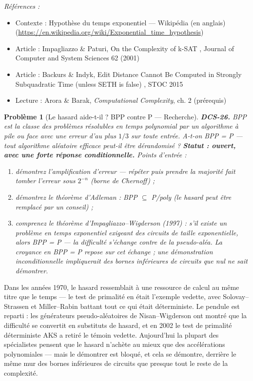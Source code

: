 \documentclass[11pt]{article}
\newtheorem{problem}{Problème}
\newenvironment{refs}{\par\small\noindent\emph{Références :}\begin{itemize}\setlength\itemsep{0pt}}{\end{itemize}\normalsize}
\begin{document}
\begin{refs}
\item Contexte : Hypothèse du temps exponentiel --- Wikipédia (en anglais) (\url{https://en.wikipedia.org/wiki/Exponential_time_hypothesis})
\item Article : Impagliazzo \& Paturi, \og{} On the Complexity of k-SAT \fg{}, Journal of Computer and System Sciences 62 (2001)
\item Article : Backurs \& Indyk, \og{} Edit Distance Cannot Be Computed in Strongly Subquadratic Time (unless SETH is false) \fg{}, STOC 2015
\item Lecture : Arora \& Barak, \textit{Computational Complexity}, ch. 2 (prérequis)
\end{refs}

\bigskip

\begin{problem}[{Le hasard aide-t-il ? BPP contre P --- Recherche}]
\textbf{DCS-26.} BPP est la classe des problèmes résolubles en temps polynomial par un algorithme à pile ou face avec une erreur d'au plus $1/3$ sur toute entrée. A-t-on BPP = P --- tout algorithme aléatoire efficace peut-il être dérandomisé ? \textbf{Statut : ouvert, avec une forte réponse conditionnelle.} Points d'entrée :
\begin{enumerate}
\item[(a)] démontrez l'amplification d'erreur --- répéter puis prendre la majorité fait tomber l'erreur sous $2^{-n}$ (borne de Chernoff) ;
\item[(b)] démontrez le théorème d'Adleman : BPP $\subseteq$ P/poly (le hasard peut être remplacé par un conseil) ;
\item[(c)] comprenez le théorème d'Impagliazzo--Wigderson (1997) : s'il existe un problème en temps exponentiel exigeant des circuits de taille exponentielle, alors BPP = P --- la difficulté s'échange contre de la pseudo-aléa. La croyance en BPP = P repose sur cet échange ; une démonstration inconditionnelle impliquerait des bornes inférieures de circuits que nul ne sait démontrer.
\end{enumerate}

\end{problem}

\noindent Dans les années 1970, le hasard ressemblait à une ressource de calcul au même titre que le temps --- le test de primalité en était l'exemple vedette, avec Solovay--Strassen et Miller--Rabin battant tout ce qui était déterministe. Le pendule est reparti : les générateurs pseudo-aléatoires de Nisan--Wigderson ont montré que la difficulté se convertit en substituts de hasard, et en 2002 le test de primalité déterministe AKS a retiré le témoin vedette. Aujourd'hui la plupart des spécialistes pensent que le hasard n'achète au mieux que des accélérations polynomiales --- mais le démontrer est bloqué, et cela se démontre, derrière le même mur des bornes inférieures de circuits que presque tout le reste de la complexité.
\end{document}
